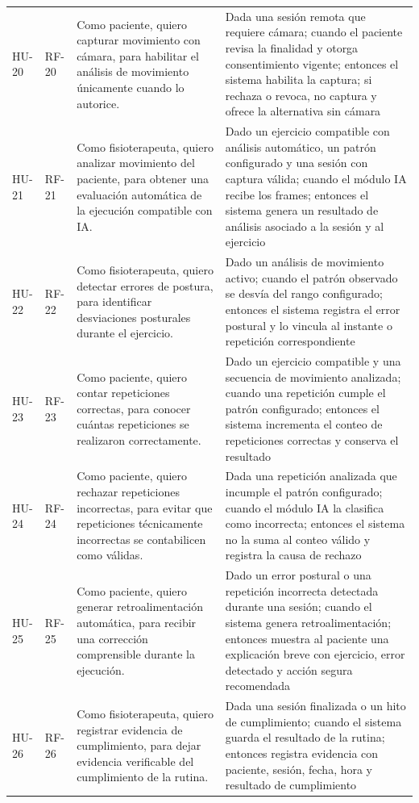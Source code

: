 \documentclass[12pt,a4paper]{article}
\begin{document}
\begin{longtable}{p{}p{}p{}p{}}
HU-20 & RF-20 & Como paciente, quiero capturar movimiento con cámara, para habilitar el análisis de movimiento únicamente cuando lo autorice. & Dada una sesión remota que requiere cámara; cuando el paciente revisa la finalidad y otorga consentimiento vigente; entonces el sistema habilita la captura; si rechaza o revoca, no captura y ofrece la alternativa sin cámara \\
HU-21 & RF-21 & Como fisioterapeuta, quiero analizar movimiento del paciente, para obtener una evaluación automática de la ejecución compatible con IA. & Dado un ejercicio compatible con análisis automático, un patrón configurado y una sesión con captura válida; cuando el módulo IA recibe los frames; entonces el sistema genera un resultado de análisis asociado a la sesión y al ejercicio \\
HU-22 & RF-22 & Como fisioterapeuta, quiero detectar errores de postura, para identificar desviaciones posturales durante el ejercicio. & Dado un análisis de movimiento activo; cuando el patrón observado se desvía del rango configurado; entonces el sistema registra el error postural y lo vincula al instante o repetición correspondiente \\
HU-23 & RF-23 & Como paciente, quiero contar repeticiones correctas, para conocer cuántas repeticiones se realizaron correctamente. & Dado un ejercicio compatible y una secuencia de movimiento analizada; cuando una repetición cumple el patrón configurado; entonces el sistema incrementa el conteo de repeticiones correctas y conserva el resultado \\
HU-24 & RF-24 & Como paciente, quiero rechazar repeticiones incorrectas, para evitar que repeticiones técnicamente incorrectas se contabilicen como válidas. & Dada una repetición analizada que incumple el patrón configurado; cuando el módulo IA la clasifica como incorrecta; entonces el sistema no la suma al conteo válido y registra la causa de rechazo \\
HU-25 & RF-25 & Como paciente, quiero generar retroalimentación automática, para recibir una corrección comprensible durante la ejecución. & Dado un error postural o una repetición incorrecta detectada durante una sesión; cuando el sistema genera retroalimentación; entonces muestra al paciente una explicación breve con ejercicio, error detectado y acción segura recomendada \\
HU-26 & RF-26 & Como fisioterapeuta, quiero registrar evidencia de cumplimiento, para dejar evidencia verificable del cumplimiento de la rutina. & Dada una sesión finalizada o un hito de cumplimiento; cuando el sistema guarda el resultado de la rutina; entonces registra evidencia con paciente, sesión, fecha, hora y resultado de cumplimiento \\

\end{longtable}
\end{document}
